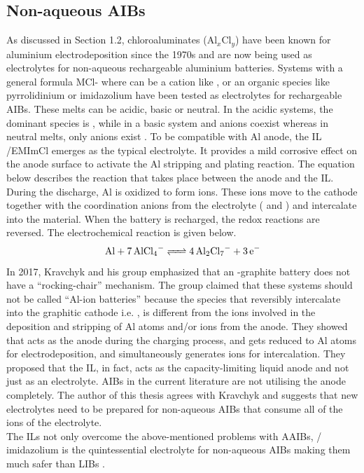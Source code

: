 \subsection{Non-aqueous AIBs}
As discussed in Section 1.2, chloroaluminates (Al$_x$Cl$_y$) have been known for aluminium electrodeposition since the 1970s and are now being used as electrolytes for non-aqueous rechargeable aluminium batteries\cite{weppner_ionic_1976, fung_reaction_1972}. Systems with a general formula MCl- where  can be a cation like ,  or an organic species like pyrrolidinium or imidazolium have been tested as electrolytes for rechargeable AIBs\cite{das_aluminium-ion_2017}. These melts can be acidic, basic or neutral. In the acidic systems, the dominant species is , while in a basic system  and  anions coexist whereas in neutral melts, only  anions exist \cite{galinski_ionic_2006,holbrey_ionic_1999}. To be compatible with Al anode, the IL /EMImCl emerges as the typical electrolyte. It provides a mild corrosive effect on the anode surface to activate the Al stripping and plating reaction. The equation below describes the reaction that takes place between the anode and the IL. During the discharge, Al is oxidized to form  ions. These ions move to the cathode together with the coordination anions from the electrolyte ( and ) and intercalate into the material. When the battery is recharged, the redox reactions are reversed. The electrochemical reaction is given below.
\begin{equation}
        \ce{Al + 7AlCl4^{-} <=> 4Al2Cl7^{-} + 3e-}
\end{equation}
In 2017, Kravchyk and his group emphasized that an -graphite battery does not have a \enquote{rocking-chair} mechanism. The group claimed that these systems should not be called \enquote{Al-ion batteries} because the species that reversibly intercalate into the graphitic cathode i.e. , is different from the ions involved in the deposition and stripping of Al atoms and/or  ions from the anode. They showed that  acts as the anode during the charging process, and gets reduced to Al atoms for electrodeposition, and simultaneously generates  ions for intercalation. They proposed that the IL, in fact, acts as the capacity-limiting liquid anode and not just as an electrolyte. AIBs in the current literature are not utilising the anode completely. The author of this thesis agrees with Kravchyk and suggests that new electrolytes need to be prepared for non-aqueous AIBs that consume all of the  ions of the electrolyte. \\
The ILs not only overcome the above-mentioned problems with AAIBs, / imidazolium is the quintessential electrolyte for non-aqueous AIBs making them much safer than LIBs \cite{jayaprakash_rechargeable_2011, lin_ultrafast_2015,wang_new_2013-1,rani_fluorinated_2013}. 

